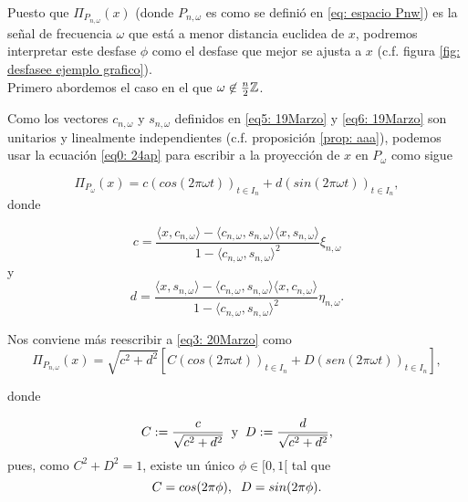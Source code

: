 
Puesto que
$\Pi_{P_{n, \omega}}(x)$ (donde $P_{n, \omega}$ es como se definió en 
\eqref{eq: espacio Pnw}) 
es la señal de frecuencia $\omega$ que está a menor
distancia euclidea de $x$, podremos interpretar este
desfase $\phi$ como el desfase que mejor se ajusta a $x$
(c.f. figura \ref{fig: desfasee ejemplo grafico}). \\

Primero abordemos el caso en el que
$\omega \not\in \frac{n}{2} \mathbb{Z}$. 

Como los vectores $c_{n, \omega}$ y $s_{n, \omega}$ 
definidos en \eqref{eq5: 19Marzo} y \eqref{eq6: 19Marzo}
son unitarios y linealmente independientes (c.f. proposición
\ref{prop: aaa}),
podemos usar la ecuación \eqref{eq0: 24ap}
para escribir a la proyección de $x$ en $P_{\omega}$ como sigue


\begin{equation}
\label{eq3: 20Marzo}
\Pi_{P_{\omega}}(x)= c (cos (2 \pi \omega t))_{t \in I_{n}} + d 
(sin (2 \pi \omega t))_{t \in I_{n}},
\end{equation}
donde

\begin{equation}
\label{eq4: 20Marzo}
c= \frac{
\langle x, c_{n, \omega} \rangle - \langle c_{n, \omega}, s_{n, \omega} \rangle
\langle x, s_{n, \omega} \rangle
}{1-\langle c_{n, \omega}, s_{n, \omega} \rangle^{2}} \xi_{n, \omega}
\end{equation}
y
\begin{equation}
\label{eq5: 20Marzo}
d= \frac{
\langle x, s_{n, \omega} \rangle - \langle c_{n, \omega}, s_{n, \omega} \rangle
\langle x, c_{n, \omega} \rangle
}{1-\langle c_{n, \omega}, s_{n, \omega} \rangle^{2}} \eta_{n, \omega}.
\end{equation}

\noindent 
Nos conviene más reescribir a \eqref{eq3: 20Marzo} como
\begin{equation}
\label{eq6: 20Marzo}
\Pi_{P_{n, \omega}}(x)= 
\sqrt{c^{2}+d^{2}}
\left[
C (cos (2 \pi \omega t))_{t \in I_{n}} +
D (sen (2 \pi \omega t))_{t \in I_{n}} 
\right],
\end{equation}

\noindent 
donde

\begin{equation}
\label{eq3: 28Marz23}
C:= \frac{c}{\sqrt{c^{2}+d^{2}}} \hspace{0.2cm} \text{y}
\hspace{0.2cm} D:= \frac{d}{\sqrt{c^{2}+d^{2}}},
\end{equation}
\noindent 
pues, como $C^{2} + D^{2}=1$, existe un único
$\phi \in [0,1[$ tal que
\begin{equation}
\label{eq7: 20Marzo}
C= cos(2 \pi \phi), \hspace{0.2cm} 
D= sin(2 \pi \phi).
\end{equation}

